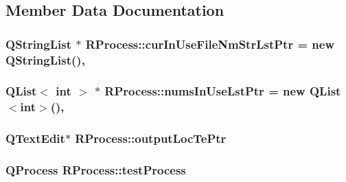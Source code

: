 \subsection{Member Data Documentation}
\hypertarget{class_r_process_a66aa093331c038eca75efca51d6fe667}{
\subsubsection[{cur\-In\-Use\-File\-Nm\-Str\-Lst\-Ptr}]{\setlength{\rightskip}{0pt plus 5cm}Q\-String\-List $\ast$ R\-Process\-::cur\-In\-Use\-File\-Nm\-Str\-Lst\-Ptr = new Q\-String\-List()\hspace{0.3cm}{\ttfamily [static]}, {\ttfamily [private]}}}\label{class_r_process_a66aa093331c038eca75efca51d6fe667}
\hypertarget{class_r_process_a094c4db859cde3c5965abb54cfdd3090}{
\subsubsection[{nums\-In\-Use\-Lst\-Ptr}]{\setlength{\rightskip}{0pt plus 5cm}Q\-List$<$ int $>$ $\ast$ R\-Process\-::nums\-In\-Use\-Lst\-Ptr = new Q\-List$<$int$>$()\hspace{0.3cm}{\ttfamily [static]}, {\ttfamily [private]}}}\label{class_r_process_a094c4db859cde3c5965abb54cfdd3090}
\hypertarget{class_r_process_aed80aa706e075172bea530beef40f62b}{
\subsubsection[{output\-Loc\-Te\-Ptr}]{\setlength{\rightskip}{0pt plus 5cm}Q\-Text\-Edit$\ast$ R\-Process\-::output\-Loc\-Te\-Ptr\hspace{0.3cm}{\ttfamily [private]}}}\label{class_r_process_aed80aa706e075172bea530beef40f62b}
\hypertarget{class_r_process_ac225a5ee65119726f1631d48b12eec17}{
\subsubsection[{test\-Process}]{\setlength{\rightskip}{0pt plus 5cm}Q\-Process R\-Process\-::test\-Process\hspace{0.3cm}{\ttfamily [private]}}}\label{class_r_process_ac225a5ee65119726f1631d48b12eec17}


